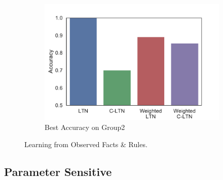 \begin{figure}[!]
\begin{subfigure}[]{0.33\textwidth}
        \includegraphics[width=\textwidth]{img/bar4.pdf}
        \caption{Best Accuracy on Group2}
        \label{fig:learning-best-accuracy-2}
    \end{subfigure}
    \caption{Learning from Observed Facts \& Rules.}
    \label{fig:learning}
\end{figure}

\subsection{Parameter Sensitive}

